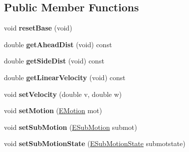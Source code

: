 \subsection*{Public Member Functions}
\begin{DoxyCompactItemize}
\item 
\mbox{\label{classmotion_1_1CActionBase_ab64789ff634b40a7c88771186deb02b3}} 
void {\bfseries reset\+Base} (void)
\item 
\mbox{\label{classmotion_1_1CActionBase_a56290a85c15b62718137f4a79a0e5d24}} 
double {\bfseries get\+Ahead\+Dist} (void) const
\item 
\mbox{\label{classmotion_1_1CActionBase_adee7bb394fc82f936af57e997ccc1f7f}} 
double {\bfseries get\+Side\+Dist} (void) const
\item 
\mbox{\label{classmotion_1_1CActionBase_ab7cac53d714c3688609f5bfb026c6c4f}} 
double {\bfseries get\+Linear\+Velocity} (void) const
\item 
\mbox{\label{classmotion_1_1CActionBase_aba9b4953364ac77f49e98ea6f59a3aad}} 
void {\bfseries set\+Velocity} (double v, double w)
\item 
\mbox{\label{classmotion_1_1CActionBase_ab83e2ccbad3a796da9c8013467f89a5d}} 
void {\bfseries set\+Motion} (\mbox{\hyperlink{motionEnums_8h_a907f80786f402332d43f4646dc1450bc}{E\+Motion}} mot)
\item 
\mbox{\label{classmotion_1_1CActionBase_a97b30f5e328649e00b8c3889ef6fce4a}} 
void {\bfseries set\+Sub\+Motion} (\mbox{\hyperlink{motionEnums_8h_a23be5ef75af9219a8bf688fd9716d72c}{E\+Sub\+Motion}} submot)
\item 
\mbox{\label{classmotion_1_1CActionBase_a82ea8bab8f8a6ccfe0f4cf4addc47d33}} 
void {\bfseries set\+Sub\+Motion\+State} (\mbox{\hyperlink{motionEnums_8h_a272f94c6143b9acf7ac44f165be53948}{E\+Sub\+Motion\+State}} submotstate)
\item 
\mbox{\label{classmotion_1_1CActionBase_aa5ea8ef039688efb9da75e552bfff955}} 

\end{DoxyCompactItemize}
